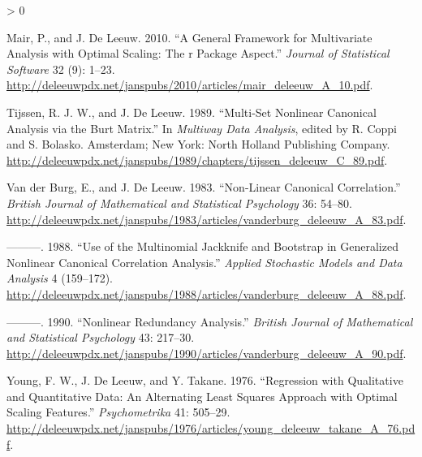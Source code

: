 \documentclass[
  12pt,
]{article}
\newlength{\cslhangindent}
\newenvironment{CSLReferences}[2] %
 {%
  \setlength{\parindent}{0pt}
  \ifodd #1 \everypar{\setlength{\hangindent}{\cslhangindent}}\ignorespaces\fi
  \ifnum #2 > 0
  \setlength{\parskip}{#2\baselineskip}
  \fi
 }%
 {}
\begin{document}
\begin{CSLReferences}{1}{0}
\leavevmode\hypertarget{ref-mair_deleeuw_A_10}{}%
Mair, P., and J. De Leeuw. 2010. {``A General Framework for Multivariate Analysis with Optimal Scaling: The r Package Aspect.''} \emph{Journal of Statistical Software} 32 (9): 1--23. \url{http://deleeuwpdx.net/janspubs/2010/articles/mair_deleeuw_A_10.pdf}.

\leavevmode\hypertarget{ref-tijssen_deleeuw_C_89}{}%
Tijssen, R. J. W., and J. De Leeuw. 1989. {``Multi-Set Nonlinear Canonical Analysis via the Burt Matrix.''} In \emph{Multiway Data Analysis}, edited by R. Coppi and S. Bolasko. Amsterdam; New York: North Holland Publishing Company. \url{http://deleeuwpdx.net/janspubs/1989/chapters/tijssen_deleeuw_C_89.pdf}.

\leavevmode\hypertarget{ref-vanderburg_deleeuw_A_83}{}%
Van der Burg, E., and J. De Leeuw. 1983. {``Non-Linear Canonical Correlation.''} \emph{British Journal of Mathematical and Statistical Psychology} 36: 54--80. \url{http://deleeuwpdx.net/janspubs/1983/articles/vanderburg_deleeuw_A_83.pdf}.

\leavevmode\hypertarget{ref-vanderburg_deleeuw_A_88}{}%
---------. 1988. {``Use of the Multinomial Jackknife and Bootstrap in Generalized Nonlinear Canonical Correlation Analysis.''} \emph{Applied Stochastic Models and Data Analysis} 4 (159--172). \url{http://deleeuwpdx.net/janspubs/1988/articles/vanderburg_deleeuw_A_88.pdf}.

\leavevmode\hypertarget{ref-vanderburg_deleeuw_A_90}{}%
---------. 1990. {``Nonlinear Redundancy Analysis.''} \emph{British Journal of Mathematical and Statistical Psychology} 43: 217--30. \url{http://deleeuwpdx.net/janspubs/1990/articles/vanderburg_deleeuw_A_90.pdf}.

\leavevmode\hypertarget{ref-young_deleeuw_takane_A_76}{}%
Young, F. W., J. De Leeuw, and Y. Takane. 1976. {``Regression with Qualitative and Quantitative Data: An Alternating Least Squares Approach with Optimal Scaling Features.''} \emph{Psychometrika} 41: 505--29. \url{http://deleeuwpdx.net/janspubs/1976/articles/young_deleeuw_takane_A_76.pdf}.

\end{CSLReferences}
\end{document}
